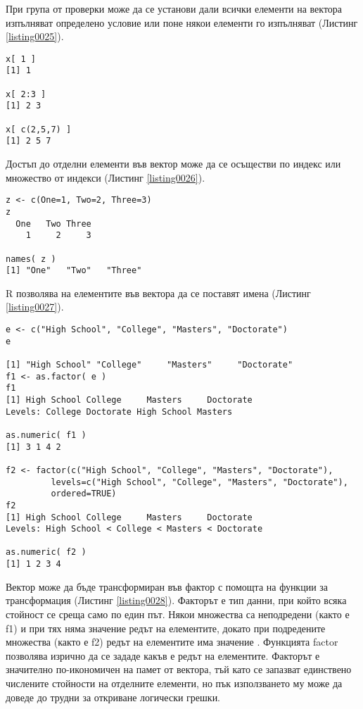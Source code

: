При група от проверки може да се установи дали всички елементи на вектора изпълняват определено условие или поне някои елементи го изпълняват (Листинг \ref{listing0025}).

\begin{lstlisting}[caption=Достъп до отделни елементи във вектор, label=listing0026]
x[ 1 ]
[1] 1

x[ 2:3 ]
[1] 2 3

x[ c(2,5,7) ]
[1] 2 5 7
\end{lstlisting}

Достъп до отделни елементи във вектор може да се осъществи по индекс или множество от индекси (Листинг \ref{listing0026}).

\begin{lstlisting}[caption=Имена на елементите във вектора, label=listing0027]
z <- c(One=1, Two=2, Three=3)
z
  One   Two Three 
    1     2     3 

names( z )
[1] "One"   "Two"   "Three"
\end{lstlisting}

R позволява на елементите във вектора да се поставят имена (Листинг \ref{listing0027}).

\begin{lstlisting}[caption=Трансформация на вектор във фактор, label=listing0028]
e <- c("High School", "College", "Masters", "Doctorate")
e

[1] "High School" "College"     "Masters"     "Doctorate"  
f1 <- as.factor( e )
f1
[1] High School College     Masters     Doctorate  
Levels: College Doctorate High School Masters

as.numeric( f1 )
[1] 3 1 4 2

f2 <- factor(c("High School", "College", "Masters", "Doctorate"), 
		 levels=c("High School", "College", "Masters", "Doctorate"),
		 ordered=TRUE)
f2
[1] High School College     Masters     Doctorate  
Levels: High School < College < Masters < Doctorate

as.numeric( f2 )
[1] 1 2 3 4
\end{lstlisting}

Вектор може да бъде трансформиран във фактор с помощта на функции за трансформация (Листинг \ref{listing0028}). Факторът е тип данни, при който всяка стойност се среща само по един път. Някои множества са неподредени (както е f1) и при тях няма значение редът на елементите, докато при подредените множества (както е f2) редът на елементите има значение . Функцията factor позволява изрично да се зададе какъв е редът на елементите. Факторът е значително по-икономичен на памет от вектора, тъй като се запазват единствено числените стойности на отделните елементи, но пък използването му може да доведе до трудни за откриване логически грешки.

